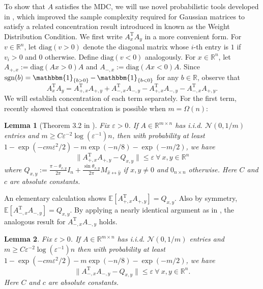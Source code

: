 \documentclass[11pt]{article}
\newcommand{\R}{\mathbb{R}}
\newcommand{\N}{\mathcal{N}}
\newcommand{\one}{\operatorname{\mathbbm{1}}}
\newcommand{\T}{\mathrm{T}}
\newcommand{\sgn}{\text{sgn}}
\newcommand{\diag}{\text{diag}}
\renewcommand{\epsilon}{\varepsilon}
\newcommand{\E}{\mathbb{E}}
\newtheorem{lemma}{Lemma}
\begin{document}
To show that $A$ satisfies the MDC, we will use novel probabilistic tools developed in \cite{Daskalaskisetal2020}, which improved the sample complexity required for Gaussian matrices to satisfy a related concentration result introduced in \cite{HV2017} known as the Weight Distribution Condition. We first write $A_x^{\T}A_y$ in a more convenient form. For $v \in \R^n$, let $\diag(v > 0)$ denote the diagonal matrix whose $i$-th entry is $1$ if $v_i > 0$ and $0$ otherwise. Define $\diag(v < 0)$ analogously. For $x \in \R^n$, let $A_{+,x}:=\diag(Ax > 0)A$ and $A_{-,x} :=\diag(Ax < 0)A$. Since $\sgn(b) = \one_{\{b > 0\}} - \one_{\{b < 0\}}$ for any $b \in \R$, observe that  $$A_x^{\T}A_y = A_{+,x}^{\T}A_{+,y} + A_{-,x}^{\T}A_{-,y} -A_{+,x}^{\T}A_{-,y}- A_{-,x}^{\T}A_{+,y}.$$ We will establish concentration of each term separately. For the first term, \cite{Daskalaskisetal2020} recently showed that concentration is possible when $m = \Omega(n)$: \begin{lemma}[Theorem 3.2 in \cite{Daskalaskisetal2020}] \label{plus_plus_conc_result} Fix $\epsilon > 0$. If $A \in \R^{m \times n}$ has i.i.d. $\N(0,1/m)$ entries and $m \geqslant C\epsilon^{-2}\log(\epsilon^{-1})n$, then with probability at least $1 - \exp(-cm\epsilon^2/2) - m\exp(-n/8) - \exp(-m/2)$, we have $$\|A_{+,x}^{\T}A_{+,y} - Q_{x,y}\|\leqslant \epsilon\ \forall\ x,y \in \R^n$$ where $Q_{x,y} := 
    \frac{\pi - \theta_{x,y}}{2\pi}I_n + \frac{\sin\theta_{x,y}}{2\pi}M_{\hat{x}\leftrightarrow\hat{y}}$ if $x,y\neq 0$ and $0_{n \times n}$ otherwise. Here $C$ and $c$ are absolute constants.

\end{lemma}

\noindent An elementary calculation shows $\E[A_{+,x}^{\T}A_{+,y}] = Q_{x,y}$. Also by symmetry, $\E[A_{-,x}^{\T}A_{-,y}] = Q_{x,y}$. By applying a nearly identical argument as in \cite{Daskalaskisetal2020}, the analogous result for $A_{-,x}^{\T}A_{-,y}$ holds. \begin{lemma} \label{neg_neg_conc_result} Fix $\epsilon > 0$. If $A \in \R^{m \times n}$ has i.i.d. $\N(0,1/m)$ entries and $m \geqslant C\epsilon^{-2}\log(\epsilon^{-1})n$ then with probability at least $1 - \exp(-cm\epsilon^2/2) - m\exp(-n/8) - \exp(-m/2)$, we have $$\|A_{-,x}^{\T}A_{-,y} - Q_{x,y}\|\leqslant \epsilon\ \forall\ x,y \in \R^n.$$ Here $C$ and $c$ are absolute constants.\end{lemma}
\end{document}
